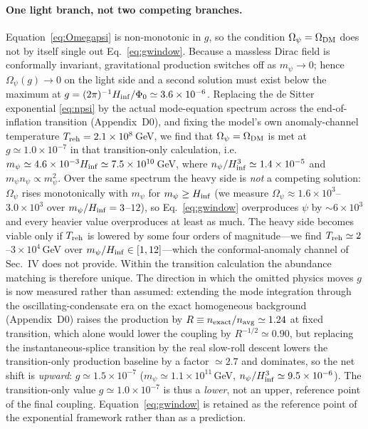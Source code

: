\documentclass[pdflatex,sn-mathphys-num]{sn-jnl}
\providecommand{\gtrsim}{\geq}
\newcommand{\PhiV}{\Phi_0}
\theoremstyle{thmstyleone}
\begin{document}
\paragraph{One light branch, not two competing branches.} Equation~\eqref{eq:Omegapsi} is non-monotonic in $g$, so the condition $\Omega_\psi=\Omega_{\rm DM}$ does not by itself single out Eq.~\eqref{eq:gwindow}. Because a massless Dirac field is conformally invariant, gravitational production switches off as $m_\psi\to0$; hence $\Omega_\psi(g)\to0$ on the light side and a second solution must exist below the maximum at $g=(2\pi)^{-1}H_{\rm inf}/\PhiV\simeq3.6\times10^{-6}$. Replacing the de Sitter exponential \eqref{eq:npsi} by the actual mode-equation spectrum across the end-of-inflation transition (Appendix~D0), and fixing the model's own anomaly-channel temperature $T_{\rm reh}=2.1\times10^{8}\,$GeV, we find that $\Omega_\psi=\Omega_{\rm DM}$ is met at $g\simeq1.0\times10^{-7}$ in that transition-only calculation, i.e.\ $m_\psi\simeq4.6\times10^{-3}H_{\rm inf}\simeq7.5\times10^{10}\,$GeV, where $n_\psi/H_{\rm inf}^3\simeq1.4\times10^{-5}$ and $m_\psi n_\psi\propto m_\psi^{2}$. Over the same spectrum the heavy side is \emph{not} a competing solution: $\Omega_\psi$ rises monotonically with $m_\psi$ for $m_\psi\gtrsim H_{\rm inf}$ (we measure $\Omega_\psi\approx1.6\times10^{3}$--$3.0\times10^{3}$ over $m_\psi/H_{\rm inf}=3$--$12$), so Eq.~\eqref{eq:gwindow} overproduces $\psi$ by $\sim6\times10^{3}$ and every heavier value overproduces at least as much. The heavy side becomes viable only if $T_{\rm reh}$ is lowered by some four orders of magnitude---we find $T_{\rm reh}\simeq2$--$3\times10^{4}\,$GeV over $m_\psi/H_{\rm inf}\in[1,12]$---which the conformal-anomaly channel of Sec.~IV does not provide. Within the transition calculation the abundance matching is therefore unique. The direction in which the omitted physics moves $g$ is now measured rather than assumed: extending the mode integration through the oscillating-condensate era on the exact homogeneous background (Appendix~D0) raises the production by $R\equiv n_{\rm exact}/n_{\rm avg}\simeq1.24$ at fixed transition, which alone would lower the coupling by $R^{-1/2}\simeq0.90$, but replacing the instantaneous-splice transition by the real slow-roll descent lowers the transition-only production baseline by a factor $\simeq2.7$ and dominates, so the net shift is \emph{upward}: $g\simeq1.5\times10^{-7}$ ($m_\psi\simeq1.1\times10^{11}\,$GeV, $n_\psi/H_{\rm inf}^3\simeq9.5\times10^{-6}$). The transition-only value $g\simeq1.0\times10^{-7}$ is thus a \emph{lower}, not an upper, reference point of the final coupling. Equation~\eqref{eq:gwindow} is retained as the reference point of the exponential framework rather than as a prediction.
\end{document}
